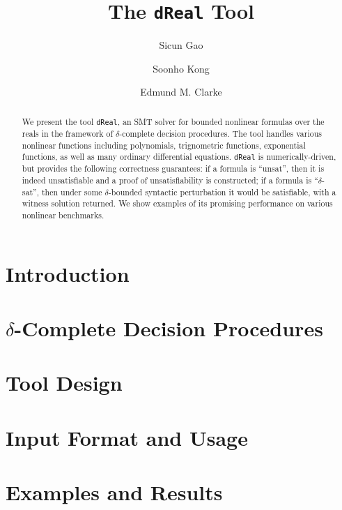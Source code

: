 \documentclass[envcountsect]{llncs}
\title{The {\tt dReal} Tool}
\author{Sicun Gao \and Soonho Kong \and Edmund M. Clarke}
\institute{Carnegie Mellon University, Pittsburgh, PA 15213}
\begin{document}
\maketitle

\begin{abstract}
We present the tool {\tt dReal}, an SMT solver for bounded
nonlinear formulas over the reals in the framework of $\delta$-complete decision
procedures. The tool handles various nonlinear functions including polynomials,
trignometric functions, exponential functions, as well as  many ordinary
differential equations. 
{\tt dReal} is numerically-driven, but provides the following correctness
guarantees: if a formula is ``unsat'', then it is indeed unsatisfiable and a proof
of unsatisfiability is constructed; if a
formula is ``$\delta$-sat'', then under some $\delta$-bounded syntactic perturbation it would
be satisfiable, with a witness solution returned. We show examples of its promising
performance on various nonlinear benchmarks. 
\end{abstract}

\section{Introduction}

\section{$\delta$-Complete Decision Procedures}

\section{Tool Design}

\section{Input Format and Usage}

\section{Examples and Results}




\end{document}
